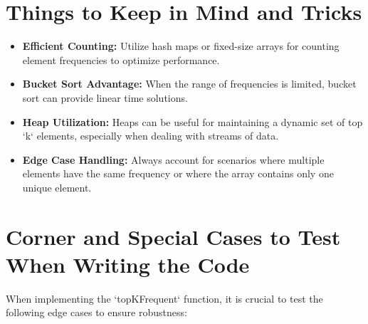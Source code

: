 \section*{Things to Keep in Mind and Tricks}
\begin{itemize}
    \item \textbf{Efficient Counting:} Utilize hash maps or fixed-size arrays for counting element frequencies to optimize performance.
    
    \item \textbf{Bucket Sort Advantage:} When the range of frequencies is limited, bucket sort can provide linear time solutions.
    
    \item \textbf{Heap Utilization:} Heaps can be useful for maintaining a dynamic set of top `k` elements, especially when dealing with streams of data.
    
    \item \textbf{Edge Case Handling:} Always account for scenarios where multiple elements have the same frequency or where the array contains only one unique element.
\end{itemize}

\section*{Corner and Special Cases to Test When Writing the Code}
When implementing the `topKFrequent` function, it is crucial to test the following edge cases to ensure robustness:

